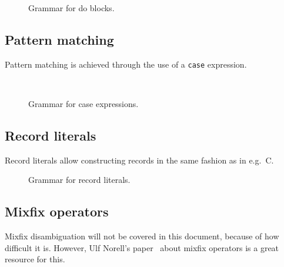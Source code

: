 \begin{figure}[H]
  \centering


  \caption{Grammar for do blocks.}
  \label{fig:zilch-gramma-expressions-do-grammar}
\end{figure}

\subsection{Pattern matching}\label{subsec:zilch-grammar-expressions-case}

Pattern matching is achieved through the use of a \texttt{case} expression.

\begin{figure}[H]
  \centering

  \\

  \caption{Grammar for case expressions.}
  \label{fig:zilch-gramma-expressions-case-grammar}
\end{figure}

\subsection{Record literals}\label{subsec:zilch-grammar-expressions-record}

Record literals allow constructing records in the same fashion as in e.g.\ C.

\begin{figure}[H]
  \centering


  \caption{Grammar for record literals.}
  \label{fig:zilch-gramma-expressions-record-grammar}
\end{figure}

\subsection{Mixfix operators}\label{subsec:zilch-grammar-expressions-mixfix}

Mixfix disambiguation will not be covered in this document, because of how difficult it is.
However, Ulf Norell's paper~\cite{mixfix-operators} about mixfix operators is a great resource for this.

